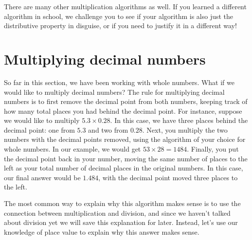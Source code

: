 \documentclass{ximera}
\begin{document}
There are many other multiplication algorithms as well. If you learned a different algorithm in school, we challenge you to see if your algorithm is also just the distributive property in disguise, or if you need to justify it in a different way!




\section{Multiplying decimal numbers}

So far in this section, we have been working with whole numbers. What if we would like to multiply decimal numbers? The rule for multiplying decimal numbers is to first remove the decimal point from both numbers, keeping track of how many total places you had behind the decimal point. For instance, suppose we would like to multiply $5.3 \times 0.28$. In this case, we have three places behind the decimal point: one from $5.3$ and two from $0.28$. Next, you multiply the two numbers with the decimal points removed, using the algorithm of your choice for whole numbers. In our example, we would get $53 \times 28 = 1484$. Finally, you put the decimal point back in your number, moving the same number of places to the left as your total number of decimal places in the original numbers. In this case, our final answer would be $1.484$, with the decimal point moved three places to the left. 

The most common way to explain why this algorithm makes sense is to use the connection between multiplication and division, and since we haven't talked about division yet we will save this explanation for later. Instead, let's use our knowledge of place value to explain why this answer makes sense.
\end{document}
